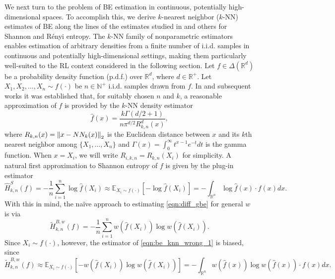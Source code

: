 We next turn to the problem of BE estimation in continuous, potentially high-dimensional spaces. To accomplish this, we derive $k$-nearest neighbor ($k$-NN) estimates of BE along the lines of the estimates studied in \citep{kozachenko1987sample, singh2003nearest, leonenko2008class, sricharan2012estimation, singh2016finite} and others for Shannon and R\'{e}nyi entropy. The $k$-NN family of nonparametric estimators enables estimation of arbitrary densities from a finite number of i.i.d. samples in continuous and potentially high-dimensional settings, making them particularly well-suited to the RL context considered in the following section.
%
%
Let $f \in \Delta(\mathbb{R}^d)$ be a probability density function (p.d.f.) over $\mathbb{R}^d$, where $d \in \mathbb{R}^+$. Let $X_1, X_2, \ldots, X_n \sim f(\cdot)$ be $n \in \mathbb{N}^+$ i.i.d. samples drawn from $f$. In \citep{loftsgaarden1965nonparametric, devroye1977strong} and subsequent works it was established that, for suitably chosen $n$ and $k$, a reasonable approximation of $f$ is provided by the $k$-NN density estimator
%
\begin{equation} \label{eqn:knn_f}
    \hat{f}(x) = \frac{ k \Gamma(d / 2 + 1) }{ n \pi^{d / 2} R^d_{k, n}(x) },
\end{equation}
%
where $R_{k, n}(x) = \left\lVert x - NN_k(x)\right\rVert_2$ is the Euclidean distance between $x$ and its $k$th nearest neighbor among $\{ X_1, \ldots, X_n \}$ and $\Gamma(x) = \int_0^{\infty} t^{x-1} e^{-t} dt$ is the gamma function. When $x = X_i$, we will write $R_{i, k, n} = R_{k, n}(X_i)$ for simplicity. A natural first approximation to Shannon entropy of $f$ is given by the plug-in estimator
%
\begin{equation} \label{eqn:shannon_knn_approx_1}
    \widehat{H}^{S}_{k,n}(f) = - \frac{1}{n} \sum_{i=1}^n \log \hat{f}(X_i) \approx \mathbb{E}_{X_i \sim f(\cdot)} \left[ - \log \hat{f}(X_i) \right] = - \int_{\mathbb{R}^n} \log \hat{f}(x) \cdot f(x) dx.
\end{equation}
%
With this in mind, the na\"{i}ve approach to estimating \eqref{eqn:diff_gbe} for general $w$ is via
%
\begin{equation} \label{eqn:be_knn_wrong_1}
    \widetilde{H}^{B,w}_{k, n}(f) = - \frac{1}{n} \sum_{i=1}^n w(\hat{f}(X_i)) \log w(\hat{f}(X_i)).
\end{equation}
%
Since $X_i \sim f(\cdot)$, however, the estimator of \eqref{eqn:be_knn_wrong_1} is biased, since
%
\begin{equation} \label{eqn:be_knn_wrong_2}
    \widetilde{H}^{B,w}_{k,n}(f) \approx \mathbb{E}_{X_i \sim f(\cdot)} \left[ - w(\hat{f}(X_i)) \log w(\hat{f}(X_i)) \right] = - \int_{\mathbb{R}^n} w(\hat{f}(x)) \log w(\hat{f}(x)) \cdot f(x) dx.
\end{equation}
